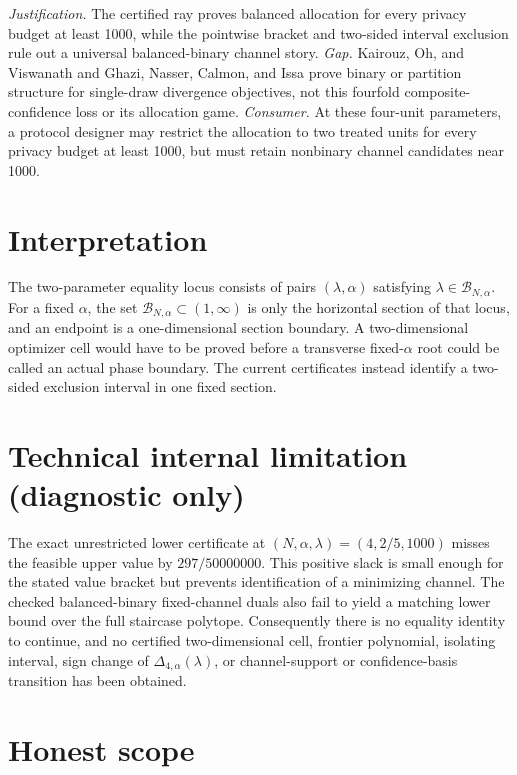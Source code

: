 \documentclass{article}
\begin{document}
\par\smallskip\noindent \textit{Justification.} The certified ray proves balanced allocation for every privacy budget at least 1000, while the pointwise bracket and two-sided interval exclusion rule out a universal balanced-binary channel story. \textit{Gap.} Kairouz, Oh, and Viswanath and Ghazi, Nasser, Calmon, and Issa prove binary or partition structure for single-draw divergence objectives, not this fourfold composite-confidence loss or its allocation game. \textit{Consumer.} At these four-unit parameters, a protocol designer may restrict the allocation to two treated units for every privacy budget at least 1000, but must retain nonbinary channel candidates near 1000.

\section{Interpretation}

The two-parameter equality locus consists of pairs \((\lambda,\alpha)\) satisfying \(\lambda\in\mathcal B_{N,\alpha}\). For a fixed \(\alpha\), the set \(\mathcal B_{N,\alpha}\subset(1,\infty)\) is only the horizontal section of that locus, and an endpoint is a one-dimensional section boundary. A two-dimensional optimizer cell would have to be proved before a transverse fixed-\(\alpha\) root could be called an actual phase boundary. The current certificates instead identify a two-sided exclusion interval in one fixed section.

\section*{Technical internal limitation (diagnostic only)}

The exact unrestricted lower certificate at \((N,\alpha,\lambda)=(4,2/5,1000)\) misses the feasible upper value by \(297/50000000\). This positive slack is small enough for the stated value bracket but prevents identification of a minimizing channel. The checked balanced-binary fixed-channel duals also fail to yield a matching lower bound over the full staircase polytope. Consequently there is no equality identity to continue, and no certified two-dimensional cell, frontier polynomial, isolating interval, sign change of \(\Delta_{4,\alpha}(\lambda)\), or channel-support or confidence-basis transition has been obtained.

\section{Honest scope}
\end{document}
